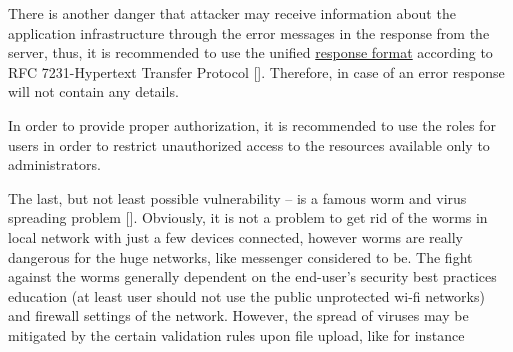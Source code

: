 There is another danger that attacker may receive information about the application infrastructure
through the error messages in the response from the server, thus, it is recommended to use the unified
\href{https://datatracker.ietf.org/doc/html/rfc7231}{response format} according to
RFC 7231-Hypertext Transfer Protocol [\cite{fielding2014rfc}].
Therefore, in case of an error response will not contain any details.

In order to provide proper authorization, it is recommended to use the roles for users in order to restrict
unauthorized access to the resources available only to administrators.

The last, but not least possible vulnerability -- is a famous worm and virus spreading problem [\cite{mannan2005instant}].
Obviously, it is not a problem to get rid of the worms in local network with just a few devices connected,
however worms are really dangerous for the huge networks, like messenger considered to be.
The fight against the worms generally dependent on the end-user's security best practices education (at least user should
not use the public unprotected wi-fi networks) and firewall settings of the network.
However, the spread of viruses may be mitigated by the certain validation rules upon file upload, like for instance
